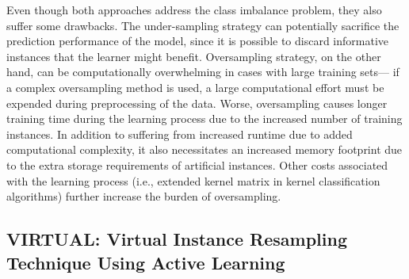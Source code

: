 Even though both approaches address the class imbalance problem, they also suffer some drawbacks. The under-sampling strategy can potentially sacrifice the prediction performance of the model, since it is possible to discard informative instances that the learner might benefit.  Oversampling strategy, on the other hand, can be computationally overwhelming in cases with large training sets--- if a complex oversampling method is used,  a large computational effort must be expended during preprocessing of the data. Worse, oversampling causes longer training time during the learning process due to the increased number of training instances. In addition to suffering from increased runtime due to added computational complexity, it also necessitates an increased memory footprint due to the extra storage requirements of artificial instances. Other costs associated with the learning process (i.e., extended kernel matrix in kernel classification algorithms) further increase the burden  of oversampling.

\subsection{\textsc{VIRTUAL}: Virtual Instance Resampling Technique Using Active Learning}

